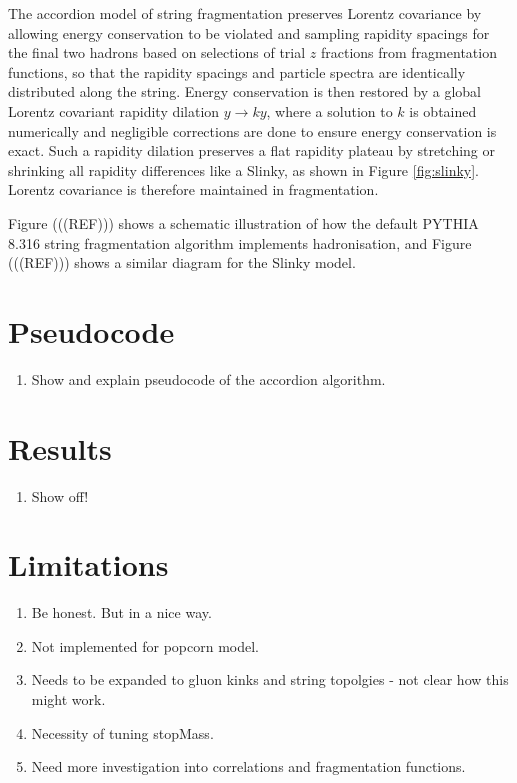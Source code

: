 \documentclass[12pt,a4paper]{report}
\begin{document}
The accordion model of string fragmentation preserves Lorentz covariance by allowing energy conservation to be violated and sampling rapidity spacings for the final two hadrons based on selections of trial $z$ fractions from fragmentation functions, so that the rapidity spacings and particle spectra are identically distributed along the string. Energy conservation is then restored by a global Lorentz covariant rapidity dilation $y \rightarrow ky$, where a solution to $k$ is obtained numerically and negligible corrections are done to ensure energy conservation is exact. Such a rapidity dilation preserves a flat rapidity plateau by stretching or shrinking all rapidity differences like a Slinky, as shown in Figure \ref{fig:slinky}. Lorentz covariance is therefore maintained in fragmentation.

Figure (((REF))) shows a schematic illustration of how the default PYTHIA 8.316 string fragmentation algorithm implements hadronisation, and Figure (((REF))) shows a similar diagram for the Slinky model.

\section{Pseudocode}
\begin{enumerate}
\item Show and explain pseudocode of the accordion algorithm.
\end{enumerate}

\section{Results}
\begin{enumerate}
\item Show off!
\end{enumerate}

\section{Limitations}
\begin{enumerate}
\item Be honest. But in a nice way.
\item Not implemented for popcorn model.
\item Needs to be expanded to gluon kinks and string topolgies - not clear how this might work.
\item Necessity of tuning stopMass.
\item Need more investigation into correlations and fragmentation functions.
\end{enumerate}
\end{document}
